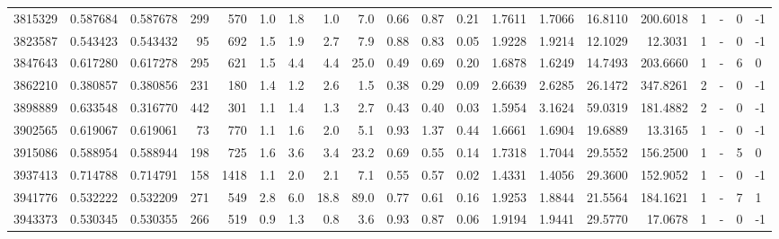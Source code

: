 \begin{tabular}{rrrrrrrrrrrrrrrrrlrl}
   3815329 & 0.587684 &   0.587678 &  299 &  570 &      1.0 &      1.8 &     1.0 &      7.0 &       0.66 &        0.87 &        0.21 &  1.7611 &  1.7066 &   16.8110 &  200.6018 &       1 &             - &        0 &        -1 \\
   3823587 & 0.543423 &   0.543432 &   95 &  692 &      1.5 &      1.9 &     2.7 &      7.9 &       0.88 &        0.83 &        0.05 &  1.9228 &  1.9214 &   12.1029 &   12.3031 &       1 &             - &        0 &        -1 \\
   3847643 & 0.617280 &   0.617278 &  295 &  621 &      1.5 &      4.4 &     4.4 &     25.0 &       0.49 &        0.69 &        0.20 &  1.6878 &  1.6249 &   14.7493 &  203.6660 &       1 &             - &        6 &         0 \\
   3862210 & 0.380857 &   0.380856 &  231 &  180 &      1.4 &      1.2 &     2.6 &      1.5 &       0.38 &        0.29 &        0.09 &  2.6639 &  2.6285 &   26.1472 &  347.8261 &       2 &             - &        0 &        -1 \\
   3898889 & 0.633548 &   0.316770 &  442 &  301 &      1.1 &      1.4 &     1.3 &      2.7 &       0.43 &        0.40 &        0.03 &  1.5954 &  3.1624 &   59.0319 &  181.4882 &       2 &             - &        0 &        -1 \\
   3902565 & 0.619067 &   0.619061 &   73 &  770 &      1.1 &      1.6 &     2.0 &      5.1 &       0.93 &        1.37 &        0.44 &  1.6661 &  1.6904 &   19.6889 &   13.3165 &       1 &             - &        0 &        -1 \\
   3915086 & 0.588954 &   0.588944 &  198 &  725 &      1.6 &      3.6 &     3.4 &     23.2 &       0.69 &        0.55 &        0.14 &  1.7318 &  1.7044 &   29.5552 &  156.2500 &       1 &             - &        5 &         0 \\
   3937413 & 0.714788 &   0.714791 &  158 & 1418 &      1.1 &      2.0 &     2.1 &      7.1 &       0.55 &        0.57 &        0.02 &  1.4331 &  1.4056 &   29.3600 &  152.9052 &       1 &             - &        0 &        -1 \\
   3941776 & 0.532222 &   0.532209 &  271 &  549 &      2.8 &      6.0 &    18.8 &     89.0 &       0.77 &        0.61 &        0.16 &  1.9253 &  1.8844 &   21.5564 &  184.1621 &       1 &             - &        7 &         1 \\
   3943373 & 0.530345 &   0.530355 &  266 &  519 &      0.9 &      1.3 &     0.8 &      3.6 &       0.93 &        0.87 &        0.06 &  1.9194 &  1.9441 &   29.5770 &   17.0678 &       1 &             - &        0 &        -1 \\

\end{tabular}
